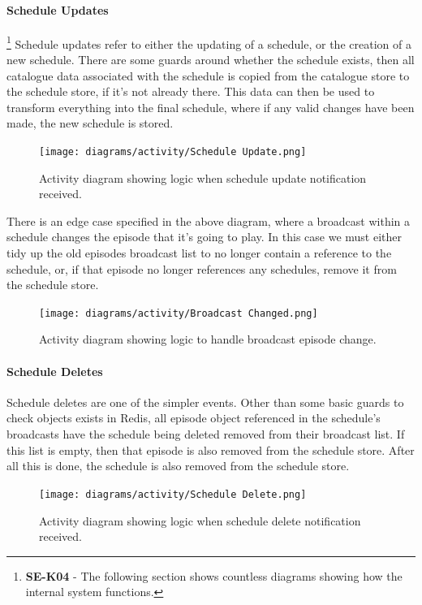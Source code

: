   \newpage
  \paragraph{Schedule Updates}
  \footnote{\textbf{SE-K04} - The following section shows countless diagrams showing how the internal system functions.}
  Schedule updates refer to either the updating of a schedule, or the creation of a new schedule. There are some guards around whether the 
  schedule exists, then all catalogue data associated with the schedule is copied from the catalogue store to the schedule store, if it's 
  not already there. This data can then be used to transform everything into the final schedule, where if any valid changes have been made, the 
  new schedule is stored.

  \begin{figure}[H]
    \centering
    \texttt{[image: diagrams/activity/Schedule Update.png]}
    \caption{Activity diagram showing logic when schedule update notification received.}
    \label{fig:scheduleUpdateActivity}
  \end{figure}

  \newpage
  There is an edge case specified in the above diagram, where a broadcast within a schedule changes the episode that it's going to play. 
  In this case we must either tidy up the old episodes broadcast list to no longer contain a reference to the schedule, or, if that episode no 
  longer references any schedules, remove it from the schedule store.

  \begin{figure}[H]
    \centering
    \texttt{[image: diagrams/activity/Broadcast Changed.png]}
    \caption{Activity diagram showing logic to handle broadcast episode change.}
    \label{fig:broadCastChangeActivity}
  \end{figure}

  \newpage
  \paragraph{Schedule Deletes}
  Schedule deletes are one of the simpler events. Other than some basic guards to check objects exists in Redis, all episode object referenced in 
  the schedule's broadcasts have the schedule being deleted removed from their broadcast list. If this list is empty, then that episode is also removed
  from the schedule store. After all this is done, the schedule is also removed from the schedule store.

  \begin{figure}[H]
    \centering
    \texttt{[image: diagrams/activity/Schedule Delete.png]}
    \caption{Activity diagram showing logic when schedule delete notification received.}
    \label{fig:scheduleDeleteActivity}
  \end{figure}

